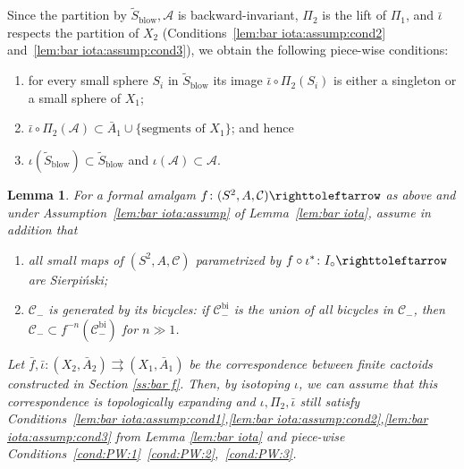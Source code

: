\documentclass{amsart}
\theoremstyle{plain}
\newtheorem{lemma}[theorem]{Lemma}
\theoremstyle{definition}
\theoremstyle{remark}
\renewcommand{\AA}{{\mathcal A}}
\newcommand{\blowup}{{\operatorname{blow}}}
\newcommand{\reminder}[1]{\textsl{$\lhd\rhd$#1$\lhd\rhd$}\marginpar{$\lhd\rhd\lhd\rhd\lhd\rhd$}}%
\newcommand{\hide}[1]{}
\newcommand{\CC}{{\mathcal C}}
\newcommand{\bi}{{\operatorname{bi}}}
\newcommand\selfmap{\righttoleftarrow}
\begin{document}
Since the partition by $\widetilde S_\blowup,\AA$ is backward-invariant, $\Pi_2$ is the lift of $\Pi_1$, and $\bar \iota$ respects the partition of $X_2$ (Conditions~\ref{lem:bar iota:assump:cond2} and~\ref{lem:bar iota:assump:cond3}), we obtain the following piece-wise conditions:
 \begin{enumerate}[label=\text{(PW\arabic*)},font=\normalfont,leftmargin=*]
 \item\label{cond:PW:1}  for every small sphere $S_i$ in $\widetilde S_\blowup$ its image $\bar \iota\circ \Pi_2(S_i)$ is either a singleton or a small sphere of $X_1$;
 \item\label{cond:PW:2}  $\bar \iota\circ \Pi_2(\AA)\subset \bar A_1\cup \{\text{segments of $X_1$}\}$; and hence
 \item\label{cond:PW:3}  $\iota(\widetilde S_\blowup)\subset \widetilde S_\blowup$ and $\iota(\AA)\subset \AA$.
 \end{enumerate}
 



\begin{lemma}
\label{lem:bar iota:exp} For a formal amalgam $f\colon(S^2,A,\CC)\selfmap$ as above and under Assumption~\eqref{lem:bar iota:assump} of Lemma~\ref{lem:bar iota}, assume in addition that 
\begin{enumerate}[label=\text{(\Alph*)},font=\normalfont,leftmargin=*]
\item all small maps of $(S^2,A,\CC)$ parametrized by $ f\circ \iota^*\colon I_\circ\selfmap$ are Sierpi\'{n}ski;
\item $\CC_-$ is generated by its bicycles: if $\CC^\bi_-$ is the union of all bicycles in $\CC_-$, then $\CC_-\subset f^{-n}(\CC^\bi_-)$ for $n\gg 1$.
\end{enumerate}
Let $\bar f,\bar \iota\colon (X_2, \bar A_2) \rightrightarrows (X_1, \bar A_1)$ be the correspondence between finite cactoids constructed in Section \ref{ss:bar f}.
Then, by isotoping $\iota$, we can assume that this correspondence is topologically expanding and $\iota,\Pi_2,\bar\iota$ still satisfy Conditions~\ref{lem:bar iota:assump:cond1},\ref{lem:bar iota:assump:cond2},\ref{lem:bar iota:assump:cond3} from Lemma \ref{lem:bar iota} and piece-wise Conditions~\ref{cond:PW:1}~\ref{cond:PW:2},~\ref{cond:PW:3}.  
\end{lemma}
\end{document}
